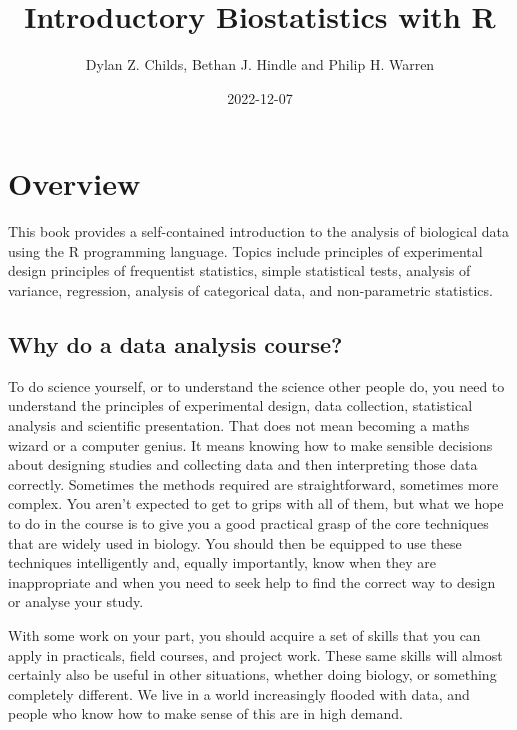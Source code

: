 \documentclass[
]{book}
\title{Introductory Biostatistics with R}
\author{Dylan Z. Childs, Bethan J. Hindle and Philip H. Warren}
\date{2022-12-07}
\begin{document}
\maketitle

{
\setcounter{tocdepth}{1}
\tableofcontents
}
\hypertarget{overview}{%
\chapter*{Overview}\label{overview}}

This book provides a self-contained introduction to the analysis of biological data using the R programming language. Topics include principles of experimental design principles of frequentist statistics, simple statistical tests, analysis of variance, regression, analysis of categorical data, and non-parametric statistics.

\hypertarget{why-do-a-data-analysis-course}{%
\section*{Why do a data analysis course?}\label{why-do-a-data-analysis-course}}

To do science yourself, or to understand the science other people do, you need to understand the principles of experimental design, data collection, statistical analysis and scientific presentation. That does not mean becoming a maths wizard or a computer genius. It means knowing how to make sensible decisions about designing studies and collecting data and then interpreting those data correctly. Sometimes the methods required are straightforward, sometimes more complex. You aren't expected to get to grips with all of them, but what we hope to do in the course is to give you a good practical grasp of the core techniques that are widely used in biology. You should then be equipped to use these techniques intelligently and, equally importantly, know when they are inappropriate and when you need to seek help to find the correct way to design or analyse your study.

With some work on your part, you should acquire a set of skills that you can apply in practicals, field courses, and project work. These same skills will almost certainly also be useful in other situations, whether doing biology, or something completely different. We live in a world increasingly flooded with data, and people who know how to make sense of this are in high demand.
\end{document}

